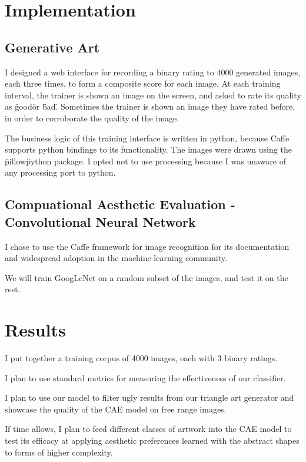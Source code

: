 \documentclass[midd]{thesis}
\begin{document}
\chapter{Implementation}

\section{Generative Art}

I designed a web interface for recording a binary rating to 4000 generated images, each three times, to form a composite score for each image. At each training interval, the trainer is shown an image on the screen, and asked to rate its quality as \"good\" or \"bad\". Sometimes the trainer is shown an image they have rated before, in order to corroborate the quality of the image.

The business logic of this training interface is written in python, because Caffe supports python bindings to its functionality. The images were drawn using the \"pillow\" python package. I opted not to use processing because I was unaware of any processing port to python.


\section{Compuational Aesthetic Evaluation - Convolutional Neural Network}

I chose to use the Caffe framework for image recognition for its documentation and widespread adoption in the machine learning community.

We will train GoogLeNet on a random subset of the images, and test it on the rest.

\chapter{Results}

I put together a training corpus of 4000 images, each with 3 binary ratings.

I plan to use standard metrics for measuring the effectiveness of our classifier.

I plan to use our model to filter ugly results from our triangle art generator and showcase the quality of the CAE model on free range images.

If time allows, I plan to feed different classes of artwork into the CAE model to test its efficacy at applying aesthetic preferences learned with the abstract shapes to forms of higher complexity.
\end{document}
